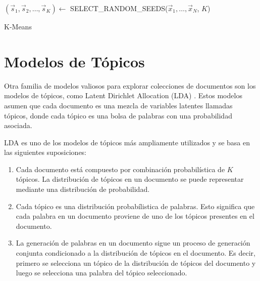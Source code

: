 \begin{algorithm}[H]
    $(\vec{s}_1, \vec{s}_2, \ldots, \vec{s}_K) \leftarrow$ SELECT\_RANDOM\_SEEDS($\vec{x}_1, \ldots, \vec{x}_N$, $K$)\;
    \;
    \caption{K-Means}\label{algo:kmeans}
\end{algorithm}

\section{Modelos de Tópicos}
Otra familia de modelos valiosos para explorar colecciones de documentos son los modelos de tópicos, como Latent Dirichlet Allocation (LDA) \cite{blei2003latent}. Estos modelos asumen que cada documento es una mezcla de variables latentes llamadas tópicos, donde cada tópico es una bolsa de palabras con una probabilidad asociada.

LDA es uno de los modelos de tópicos más ampliamente utilizados y se basa en las siguientes suposiciones:

\begin{enumerate}
 \item Cada documento está compuesto por combinación probabilística de $K$ tópicos. La distribución de tópicos en un documento se puede representar mediante una distribución de probabilidad.

\item Cada tópico es una distribución probabílistica de palabras. Esto significa que cada palabra en un documento proviene de uno de los tópicos presentes en el documento.

\item La generación de palabras en un documento sigue un proceso de generación conjunta condicionado a la distribución de tópicos en el documento. Es decir, primero se selecciona un tópico de la distribución de tópicos del documento y luego se selecciona una palabra del tópico seleccionado.
\end{enumerate}


